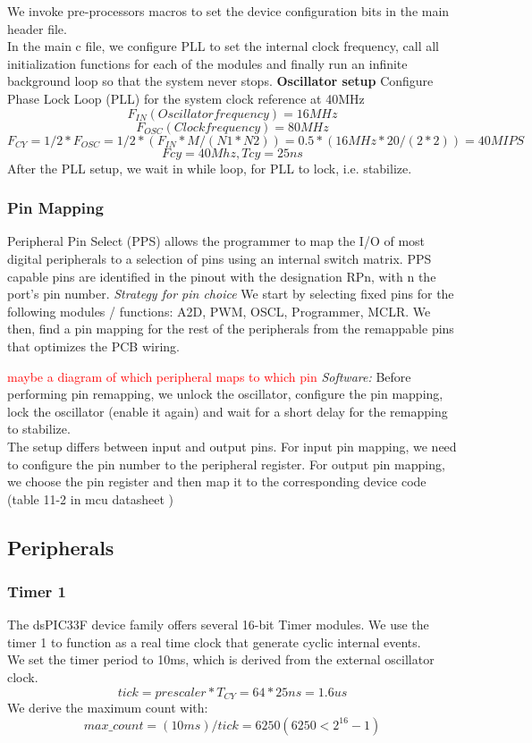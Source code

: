 We invoke pre-processors macros to set the device configuration bits in the main header file.\\
In the main c file, we configure PLL to set the internal clock frequency, call all initialization functions for each of the modules and finally run an infinite background loop so that the system never stops.
\vskip 0.2in
\noindent
\textbf{Oscillator setup}
\vskip 0.1in
\noindent
Configure Phase Lock Loop (PLL) for the system clock reference at 40MHz
	$$F_{IN} (Oscillator frequency) = 16MHz  $$
    $$F_{OSC} (Clock frequency) =  80MHz$$
 	$$F_{CY} = 1/2 * F_{OSC} = 1/2 * (F_{IN}*M/(N1*N2)) = 0.5 * (16MHz*20/(2*2)) = 40 MIPS$$
$$Fcy=40Mhz, Tcy=25ns$$
After the PLL setup, we wait in while loop, for PLL to lock, i.e. stabilize.

\subsubsection*{Pin Mapping}

Peripheral Pin Select (PPS) allows the programmer to map the I/O of most digital peripherals to a selection of pins using an internal switch matrix.
PPS capable pins are identified in the pinout with the designation RPn, with n the port’s pin number.
\vskip 0.2in
\noindent
\textit{Strategy for pin choice}
\vskip 0.1in
\noindent
We start by selecting fixed pins for the following modules / functions: A2D, PWM, OSCL, Programmer, MCLR. We then, find a pin mapping for the rest of the peripherals from the remappable pins that optimizes the PCB wiring.

\textcolor{red}{
maybe a diagram of which peripheral maps to which pin
}
\vskip 0.2in
\noindent
\textit{Software:}
\vskip 0.1in
\noindent
Before performing pin remapping, we unlock the oscillator, configure the pin mapping, lock the oscillator (enable it again) and wait for a short delay for the remapping to stabilize.\\
The setup differs between input and output pins. For input pin mapping, we need to configure the pin number to the peripheral register. For output pin mapping, we choose the pin register and then map it to the corresponding device code (table 11-2 in mcu datasheet \cite{mcu})

\subsection{Peripherals}
\subsubsection*{Timer 1}
The dsPIC33F device family offers several 16-bit Timer modules. We use the timer 1 to function as a real time clock that generate cyclic internal events.\\
We set the timer period to 10ms, which is derived from the external oscillator clock.
$$tick=prescaler*T_{CY}= 64*25ns= 1.6us $$
We derive the maximum count with:
$$max\_count=(10 ms)/tick=6250 (6250<2^{16}-1)$$

